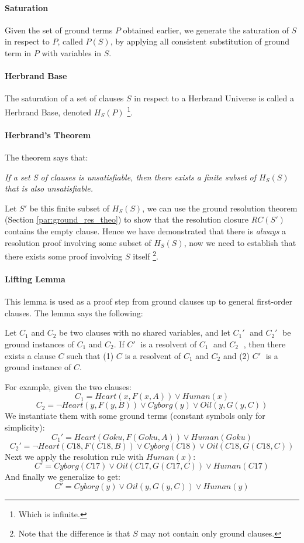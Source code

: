 \documentclass[10pt,a4paper]{article}
\begin{document}
\begin{itemize}
\paragraph{Saturation} Given the set of ground terms $P$ obtained earlier, we generate the saturation of $S$ in respect to $P$, called $P(S)$, by applying all consistent substitution of ground term in $P$ with variables in $S$.

\paragraph{Herbrand Base}
\label{sec:herbrand_base}
The saturation of a set of clauses $S$ in respect to a Herbrand Universe is called a Herbrand Base, denoted $H_S(P)$ \footnote{Which is infinite.}.

\paragraph{Herbrand's Theorem}
The theorem says that:
\begin{center}
\textit{If a set S of clauses is unsatisfiable, then there exists a finite subset of $H_S(S)$ that
is also unsatisfiable.}
\end{center}
Let $S'$ be this finite subset of $H_S(S)$, we can use the ground resolution theorem (Section \ref{par:ground_res_theo}) to show that the resolution closure $RC(S')$ contains the empty clause. Hence we have demonstrated that there is \textit{always} a resolution proof involving some subset of $H_S(S)$, now we need to establish that there exists some proof involving $S$ itself \footnote{Note that the difference is that $S$ may not contain only ground clauses.}.

\paragraph{Lifting Lemma}
This lemma is used as a proof step from ground clauses up to general first-order clauses. The lemma says the following:
\begin{center}
Let $C_1$ and $C_2$ be two clauses with no shared variables, and let $C_1'$ and $C_2'$ be ground instances of $C_1$ and $C_2$. If $C'$ is a resolvent of $C_1$ and $C_2$ , then there exists a clause $C$ such that (1) $C$ is a resolvent of $C_1$ and $C_2$ and (2) $C'$ is a ground instance of $C$.
\end{center} 
For example, given the two clauses:
\[C_1=Heart(x,F(x,A))\vee Human(x)\]
\[C_2=\neg Heart(y,F(y,B))\vee Cyborg(y)\vee Oil(y,G(y,C))\]
We instantiate them with some ground terms (constant symbols only for simplicity):
\[C_1'=Heart(Goku,F(Goku,A))\vee Human(Goku)\]
\[C_2'=\neg Heart(C18,F(C18,B))\vee Cyborg(C18)\vee Oil(C18,G(C18,C))\]
Next we apply the resolution rule with $Human(x)$:
\[C'=Cyborg(C17)\vee Oil(C17,G(C17,C))\vee Human(C17)\]
And finally we generalize to get:
\[C'=Cyborg(y)\vee Oil(y,G(y,C))\vee Human(y)\]



\end{itemize}
\end{document}
